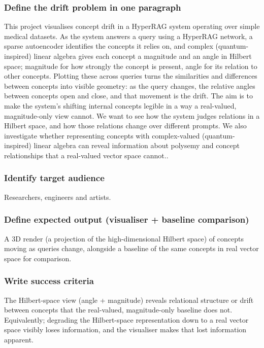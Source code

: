 \documentclass[twoside,10pt]{article}
\begin{document}
\subsubsection{Define the drift problem in one paragraph}
This project visualises concept drift in a HyperRAG system operating over simple medical datasets. 
As the system answers a query using a HyperRAG network, a sparse autoencoder identifies the concepts it relies on, and complex (quantum-inspired) 
linear algebra gives each concept a magnitude and an angle in Hilbert space; magnitude for how strongly the concept is present, 
angle for its relation to other concepts. Plotting these across queries turns the similarities and differences 
between concepts into visible geometry: as the query changes, the relative angles between concepts open and close, and that movement is the drift. 
The aim is to make the system's shifting internal concepts legible in a way a real-valued, magnitude-only view cannot.
We want to see how the system judges relations in a Hilbert space, and how those relations change over different prompts.
We also investigate whether representing concepts with complex-valued (quantum-inspired) linear algebra can reveal information about polysemy and 
concept relationships that a real-valued vector space cannot.\cite{laine2025quantumllm}.

\subsubsection{Identify target audience}
Researchers, engineers and artists.
\subsubsection{Define expected output (visualiser + baseline comparison)}
A 3D render (a projection of the high-dimensional Hilbert space) of concepts moving as queries change, 
alongside a baseline of the same concepts in real vector space for comparison.

\subsubsection{Write success criteria}
The Hilbert-space view (angle + magnitude) reveals relational structure or drift between concepts that the real-valued, 
magnitude-only baseline does not. Equivalently; degrading the Hilbert-space representation down to a real vector space visibly 
loses information, and the visualiser makes that lost information apparent.
\end{document}
